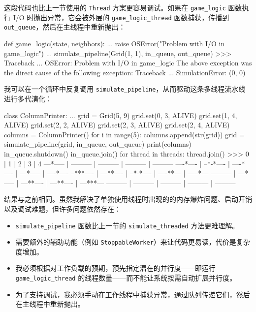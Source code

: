 这段代码也比上一节使用的 \texttt{Thread} 方案更容易调试。如果在 \texttt{game\_logic} 函数执行 I/O 时抛出异常，它会被外层的 \texttt{game\_logic\_thread} 函数捕获，传播到 \texttt{out\_queue}，然后在主线程中重新抛出：

\begin{codebox}[python]
def game_logic(state, neighbors):
    ...
    raise OSError("Problem with I/O in game_logic")
    ...
simulate_pipeline(Grid(1, 1), in_queue, out_queue)
>>>
Traceback ...
OSError: Problem with I/O in game_logic
The above exception was the direct cause of the following
exception:
Traceback ...
SimulationError: (0, 0)
\end{codebox}

我可以在一个循环中反复调用 \texttt{simulate\_pipeline}，从而驱动这条多线程流水线进行多代演化：

\begin{codebox}[python]
class ColumnPrinter:
    ...
grid = Grid(5, 9)
grid.set(0, 3, ALIVE)
grid.set(1, 4, ALIVE)
grid.set(2, 2, ALIVE)
grid.set(2, 3, ALIVE)
grid.set(2, 4, ALIVE)
columns = ColumnPrinter()
for i in range(5):
    columns.append(str(grid))
    grid = simulate_pipeline(grid, in_queue, out_queue)
print(columns)
in_queue.shutdown()
in_queue.join()
for thread in threads:
    thread.join()
>>>
    0     |     1     |     2     |     3     |     4
---*----- | --------- | --------- | --------- | ---------
----*---- | --*-*---- | ----*---- | ---*----- | ----*----
--***---- | ---**---- | --*-*---- | ----**--- | -----*---
--------- | ---*----- | ---**---- | ---**---- | ---***---
--------- | --------- | --------- | --------- | ---------
\end{codebox}

结果与之前相同。虽然我解决了单独使用线程时出现的的内存爆炸问题、启动开销以及调试难题，但许多问题依然存在：

\begin{itemize}
\item \texttt{simulate\_pipeline} 函数比上一节的 \texttt{simulate\_threaded} 方法更难理解。
\item 需要额外的辅助功能（例如 \texttt{StoppableWorker}）来让代码更易读，代价是复杂度增加。
\item 我必须根据对工作负载的预期，预先指定潜在的并行度——即运行 \texttt{game\_logic\_thread} 的线程数量——而不能让系统按需自动扩展并行度。
\item 为了支持调试，我必须手动在工作线程中捕获异常，通过队列传递它们，然后在主线程中重新抛出。
\end{itemize}

